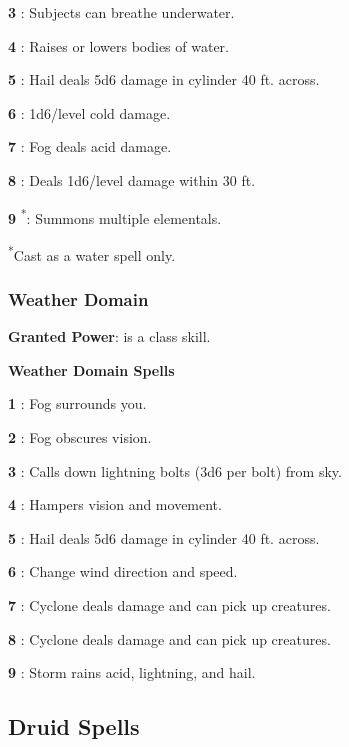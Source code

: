 \textbf{3} : Subjects can breathe underwater.

\textbf{4} : Raises or lowers bodies of water.

\textbf{5} : Hail deals 5d6 damage in cylinder 40 ft. across.

\textbf{6} : 1d6/level cold damage.

\textbf{7} : Fog deals acid damage.

\textbf{8} : Deals 1d6/level damage within 30 ft.

\textbf{9} \textsuperscript{*}: Summons multiple elementals.

\textsuperscript{*}Cast as a water spell only.

\subsubsection{Weather Domain}

\textbf{Granted Power}:  is a class skill.

\textbf{Weather Domain Spells}

\textbf{1} : Fog surrounds you.

\textbf{2} : Fog obscures vision.

\textbf{3} : Calls down lightning bolts (3d6 per bolt) from sky.

\textbf{4} : Hampers vision and movement.

\textbf{5} : Hail deals 5d6 damage in cylinder 40 ft. across.

\textbf{6} : Change wind direction and speed.

\textbf{7} : Cyclone deals damage and can pick up creatures.

\textbf{8} : Cyclone deals damage and can pick up creatures.

\textbf{9} : Storm rains acid, lightning, and hail.

\subsection{Druid Spells}

